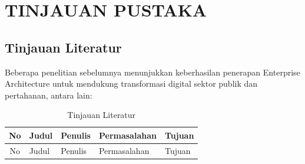 \cleardoublepage %
\chapter{TINJAUAN PUSTAKA}
\label{chap:tinjauan-pustaka}
\section{Tinjauan Literatur}
Beberapa penelitian sebelumnya menunjukkan keberhasilan penerapan Enterprise Architecture untuk mendukung transformasi digital sektor publik dan pertahanan, antara lain:
\begin{longtable}{|c|p{3cm}|p{3cm}|p{3cm}|p{3cm}|}
\caption{Tinjauan Literatur} \\
\hline
No & Judul & Penulis & Permasalahan & Tujuan \\
\hline
\endfirsthead

\hline
No & Judul & Penulis & Permasalahan & Tujuan \\
\hline
\endhead


\end{longtable}
